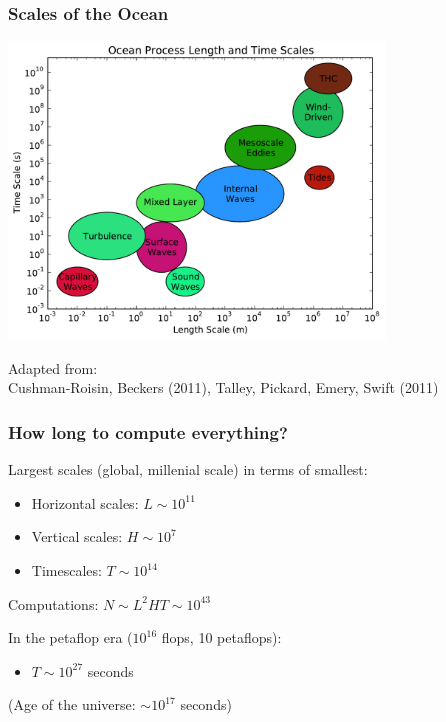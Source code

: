 \documentclass[red]{beamer}
\begin{document}
\begin{frame}
    \frametitle{Scales of the Ocean}
    
    \begin{center}
        \includegraphics[width=0.75\textwidth]{ocean_scales.pdf}
    \end{center}
    
    {\tiny Adapted from:\\
        Cushman-Roisin, Beckers (2011), Talley, Pickard, Emery, Swift (2011)}
\end{frame}

\begin{frame}
    \frametitle{How long to compute everything?}
    
    Largest scales (global, millenial scale) in terms of smallest:
    \begin{itemize}
        \item Horizontal scales: $L \sim 10^{11}$
        \item Vertical scales: $H \sim 10^7$
        \item Timescales: $T \sim 10^{14}$
    \end{itemize}
    Computations: $N \sim L^2 H T \sim 10^{43}$
    
    \vspace{10pt}
    
    In the petaflop era ($10^{16}$ flops, 10 petaflops):
    \begin{itemize}
        \item $T \sim 10^{27}$ seconds
    \end{itemize}
    (Age of the universe: $\sim 10^{17}$ seconds)
\end{frame}
\end{document}
